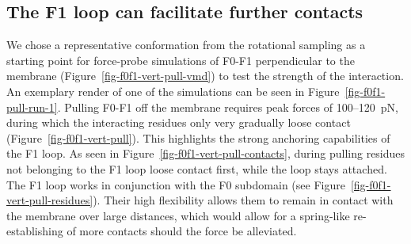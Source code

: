 \documentclass[
  letterpaper,
  DIV=11,
  numbers=noendperiod]{scrartcl}
\begin{document}
\hypertarget{the-f1-loop-can-facilitate-further-contacts}{%
\subsection{The F1 loop can facilitate further
contacts}\label{the-f1-loop-can-facilitate-further-contacts}}

We chose a representative conformation from the rotational sampling as a
starting point for force-probe simulations of F0-F1 perpendicular to the
membrane (Figure~\ref{fig-f0f1-vert-pull-vmd}) to test the strength of
the interaction. An exemplary render of one of the simulations can be
seen in Figure~\ref{fig-f0f1-pull-run-1}. Pulling F0-F1 off the membrane
requires peak forces of 100--120~pN, during which the interacting
residues only very gradually loose contact
(Figure~\ref{fig-f0f1-vert-pull}). This highlights the strong anchoring
capabilities of the F1 loop. As seen in
Figure~\ref{fig-f0f1-vert-pull-contacts}, during pulling residues not
belonging to the F1 loop loose contact first, while the loop stays
attached. The F1 loop works in conjunction with the F0 subdomain (see
Figure~\ref{fig-f0f1-vert-pull-residues}). Their high flexibility allows
them to remain in contact with the membrane over large distances, which
would allow for a spring-like re-establishing of more contacts should
the force be alleviated.
\end{document}
